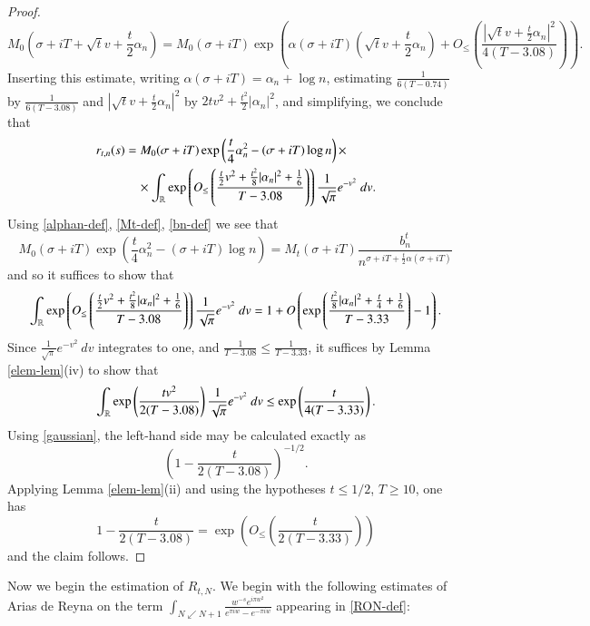 \begin{proof}
$$ M_0( \sigma + iT + \sqrt{t} v + \frac{t}{2} \alpha_n) = M_0(\sigma+iT) \exp\left( \alpha(\sigma+iT) (\sqrt{t} v + \frac{t}{2} \alpha_n) + O_{\leq}\left( \frac{|\sqrt{t} v + \frac{t}{2} \alpha_n|^2}{4(T-3.08)}  \right)\right).$$
Inserting this estimate, writing $\alpha(\sigma+iT) = \alpha_n + \log n$, estimating $\frac{1}{6(T-0.74)}$ by $\frac{1}{6(T-3.08)}$ and $|\sqrt{t} v + \frac{t}{2} \alpha_n|^2$ by $2tv^2 + \frac{t^2}{2} |\alpha_n|^2$, and simplifying, we conclude that
\begin{align*}
 r_{t,n}(s) &= M_0(\sigma+iT) \exp\left( \frac{t}{4} \alpha_n^2 - (\sigma+iT) \log n\right) \times \\
&\quad \times  \int_{\mathbb{R}} \exp\left(  O_{\leq}\left( \frac{\frac{t}{2}v^2 + \frac{t^2}{8} |\alpha_n|^2 + \frac{1}{6}}{T-3.08} \right) \right) \frac{1}{\sqrt{\pi}} e^{-v^2}\ dv.
\end{align*}
Using \eqref{alphan-def}, \eqref{Mt-def}, \eqref{bn-def} we see that
$$ M_0(\sigma+iT) \exp\left( \frac{t}{4} \alpha_n^2 - (\sigma+iT) \log n\right) = M_t(\sigma+iT) \frac{b_n^t}{n^{\sigma+iT+\frac{t}{2} \alpha(\sigma+iT)}} $$
and so it suffices to show that
$$  \int_{\mathbb{R}} \exp\left( O_{\leq}\left( \frac{\frac{t}{2}v^2 + \frac{t^2}{8} |\alpha_n|^2 + \frac{1}{6}}{T-3.08} \right) \right)\frac{1}{\sqrt{\pi}} e^{-v^2}\ dv = 1 + O\left(\exp\left( \frac{\frac{t^2}{8} |\alpha_n|^2 + \frac{t}{4} + \frac{1}{6}}{T-3.33} \right)-1\right).$$
Since $\frac{1}{\sqrt{\pi}} e^{-v^2}\ dv $ integrates to one, and $\frac{1}{T-3.08} \leq \frac{1}{T-3.33}$, it suffices by Lemma \ref{elem-lem}(iv) to show that
\begin{equation}\label{ax}
  \int_{\mathbb{R}} \exp\left( \frac{t v^2}{2(T-3.08)} \right) \frac{1}{\sqrt{\pi}} e^{-v^2}\ dv \leq \exp\left( \frac{t}{4(T-3.33)} \right).
	\end{equation}
Using \eqref{gaussian}, the left-hand side may be calculated exactly as
$$ \left(1 - \frac{t}{2(T-3.08)}\right)^{-1/2}.$$
Applying Lemma \ref{elem-lem}(ii) and using the hypotheses $t \leq 1/2$, $T \geq 10$, one has
$$ 1 - \frac{t}{2(T-3.08)} = \exp( O_{\leq}( \frac{t}{2(T-3.33)} ))$$
and the claim follows.
\end{proof}

Now we begin the estimation of $R_{t,N}$.  We begin with the following estimates of Arias de Reyna \cite{arias} on the term $\int_{N \swarrow N+1} \frac{w^{-s} e^{i\pi w^2}}{e^{\pi i w} - e^{-\pi i w}}$ appearing in \eqref{RON-def}:

